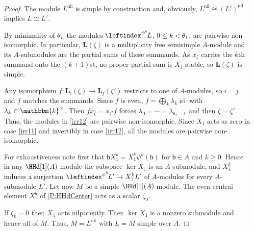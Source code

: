 \documentclass[a4paper,11pt]{amsart}
\numberwithin{equation}{subsection}
\theoremstyle{definition}
\theoremstyle{theorem}
\theoremstyle{remark}
\newcommand\bb{\mathsf{b}}
\newcommand\op{\operatorname}
\newcommand\kk{\mathbbm{k}}
\begin{document}
\begin{proof}
  The module $L^{\mathrm{nil}}$ is simple by construction and,  obviously, $L^{\mathrm{nil}}\cong(L')^{\mathrm{nil}}$ implies $L\cong L'$.

   By minimality of $\theta_L$ the modules
  $\leftindex^{\psi^k}\!L$, $0\le k<\theta_L$, are pairwise non-isomorphic. In particular,
  $\mathbf L(\zeta)$ is a multiplicity free semisimple $A$-module and its
  $A$-submodules are the partial sums of these summands.  As $x_\zeta$
  carries the $k$th summand onto the $(k+1)$st, no proper partial sum is
  $X_1$-stable, so $\mathbf L(\zeta)$ is simple.

  Any isomorphism $f\colon \mathbf L_i(\zeta)\to \mathbf L_j(\zeta')$ restricts to one of $A$-modules,
  so $i=j$ and $f$ matches the summands. Since $f$ is even,
  $f=\bigoplus_k\lambda_k\op{id}$ with $\lambda_k\in\kk^\times$. Then
  $fx_\zeta=x_{\zeta'}f$ forces $\lambda_0=\cdots=\lambda_{\theta_L-1}$ and then
  $\zeta=\zeta'$.  Thus, the modules in \autoref{irr12} are pairwise non-isomorphic.
   Since  $X_1$ acts as zero in case \autoref{irr11} and invertibly in case \autoref{irr12}, all the modules are pairwise non-isomorphic.

  For exhaustiveness note first that
  $\bb X_1^k=X_1^k\psi^{k}(\bb)$ for $\bb\in A$ and $k\ge0$.  Hence in any
  $\HHd[1](A)$-module the subspace $\ker X_1$ is an $A$-submodule, and $X_1^k$
  induces a surjection $\leftindex^{\psi^k}\!L'\to X_1^kL'$ of $A$-modules
  for every $A$-submodule $L'$.  Let now $M$ be a simple
  $\HHd[1](A)$-module.  The even central element $X^\theta$ of
  \autoref{P:HHdCenter} acts as a scalar $\zeta_0$.

  If $\zeta_0=0$ then $X_1$ acts
  nilpotently. Then $\ker X_1$ is a nonzero submodule and hence all of $M$. Thus,
  $M=L^{\mathrm{nil}}$ with $L=M$ simple over $A$.


\end{proof}
\end{document}
